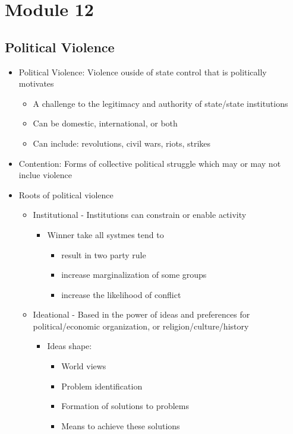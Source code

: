 \documentclass[11pt]{article}
\begin{document}
\section{Module 12}
\label{sec:orgac1f7b9}
\subsection{Political Violence}
\label{sec:org8cbf651}
\begin{itemize}
\item Political Violence: Violence ouside of state control that is politically motivates
\begin{itemize}
\item A challenge to the legitimacy and authority of state/state institutions
\item Can be domestic, international, or both
\item Can include: revolutions, civil wars, riots, strikes
\end{itemize}
\item Contention: Forms of collective political struggle which may or may not inclue violence
\item Roots of political violence
\begin{itemize}
\item Institutional - Institutions can constrain or enable activity
\begin{itemize}
\item Winner take all systmes tend to
\begin{itemize}
\item result in two party rule
\item increase marginalization of some groups
\item increase the likelihood of conflict
\end{itemize}
\end{itemize}
\item Ideational - Based in the power of ideas and preferences for political/economic organization, or religion/culture/history
\begin{itemize}
\item Ideas shape:
\begin{itemize}
\item World views
\item Problem identification
\item Formation of solutions to problems
\item Means to achieve these solutions
\end{itemize}

\end{itemize}
\end{itemize}
\end{itemize}
\end{document}

